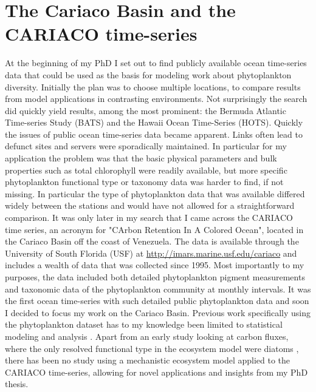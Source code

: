 \section{The Cariaco Basin and the CARIACO time-series}
\label{CARIACOintro}


At the beginning of my PhD I set out to find publicly available ocean time-series data that could be used as the basis for modeling work about phytoplankton diversity. Initially the plan was to choose multiple locations, to compare results from model applications in contrasting environments. Not surprisingly the search did quickly yield results, among the most prominent: the Bermuda Atlantic Time-series Study (BATS) and the Hawaii Ocean Time-Series (HOTS). Quickly the issues of public ocean time-series data became apparent. Links often lead to defunct sites and servers were sporadically maintained. In particular for my application the problem was that the basic physical parameters and bulk properties such as total chlorophyll were readily available, but more specific phytoplankton functional type or taxonomy data was harder to find, if not missing. In particular the type of phytoplankton data that was available differed widely between the stations and would have not allowed for a straightforward comparison. It was only later in my search that I came across the CARIACO time series, an acronym for "CArbon Retention In A Colored Ocean", located in the Cariaco Basin off the coast of Venezuela. The data is available through the University of South Florida (USF) at \href{http://imars.marine.usf.edu/cariaco}{http://imars.marine.usf.edu/cariaco} and includes a wealth of data that was collected since 1995. Most importantly to my purposes, the data included both detailed phytoplankton pigment measurements and taxonomic data of the phytoplankton community at monthly intervals. It was the first ocean time-series with such detailed public phytoplankton data and soon I decided to focus my work on the Cariaco Basin. Previous work specifically using the phytoplankton dataset has to my knowledge been limited to statistical modeling and analysis \citep{Taylor2012,Mutshinda2013a, Mutshinda2013,Pinckney2015,Irwin2015}. Apart from an early study looking at carbon fluxes, where the only resolved functional type in the ecosystem model were diatoms \citep{Walsh2002a}, there has been no study using a mechanistic ecosystem model applied to the CARIACO time-series, allowing for novel applications and insights from my PhD thesis.    

